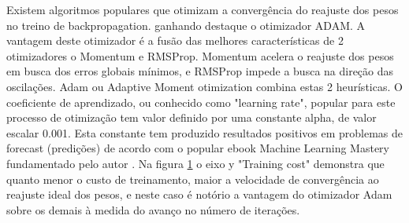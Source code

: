         Existem algoritmos populares que otimizam a convergência do reajuste dos pesos no treino de backpropagation. ganhando destaque o otimizador ADAM. A vantagem deste otimizador é a fusão das melhores características de 2 otimizadores o Momentum e RMSProp. Momentum acelera o reajuste dos pesos em busca dos erros globais mínimos, e RMSProp impede a busca na direção das oscilações.\newline
         Adam ou Adaptive Moment otimization combina estas 2 heurísticas. O coeficiente de aprendizado, ou conhecido como "learning rate", popular para este processo de otimização tem valor definido por uma constante alpha, de valor escalar 0.001.
        Esta constante tem produzido resultados positivos em problemas de forecast (predições) de acordo com o popular ebook Machine Learning Mastery fundamentado pelo autor \cite{MLM}. Na figura \ref{fig:otimizadores} o eixo y "Training cost" demonstra que quanto menor o custo de treinamento, maior a velocidade de convergência ao reajuste ideal dos pesos, e neste caso é notório a vantagem do otimizador Adam sobre os demais à medida do avanço no número de iterações.
        \begin{figure}[H]
        	 \label{fig:otimizadores}
        \end{figure}
            
